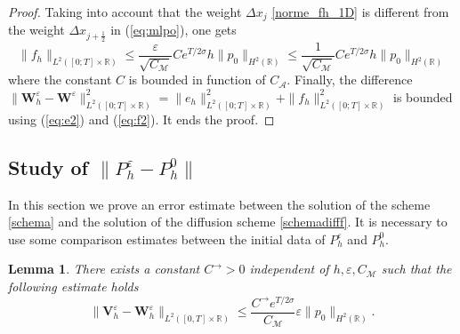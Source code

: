 \documentclass[a4paper,french,english,10pt]{article}
\newcommand\eps{\varepsilon}
\newcommand\V{\mathbf{V}}
\newcommand\W{\mathbf{W}}
\newtheorem{lemma}[theorem]{Lemma}
\begin{document}
\begin{proof}
Taking into account that the weight $\Delta x_j$  \eqref{norme_fh_1D} is different from the weight
$\Delta x_{j+\frac12}$ in (\ref{eq:mlpo}), one gets 
\begin{equation}\label{eq:f2}
\| f_h \|_{L^2([0;T]\times \mathbb{R})}\leq \frac\varepsilon {\sqrt { C_\mathcal M} } C e^{T/2\sigma }
h  \| p_0 \| _{H^2(\mathbb{R})}\leq \frac1 { \sqrt { C_\mathcal M} } C e^{T/2\sigma }
h  \| p_0 \| _{H^2(\mathbb{R})}
\end{equation}
where the constant $C$ is bounded in function of $C_\mathcal A$.
Finally, the difference 
$\|\W_h^\eps-\W^\eps\|_{L^2([0;T]\times \mathbb{R})}^2=
\|e_h\|_{L^2([0;T]\times \mathbb{R})}^2+\|f_h\|_{L^2([0;T]\times \mathbb{R})}^2
$ 
is bounded using (\ref{eq:e2}) and (\ref{eq:f2}).
It ends the proof.
\end{proof}


\subsection{Study of $\| P_h^\varepsilon - P^0_h  \|$}

In this section we 
 prove an error estimate between the solution of the
scheme \eqref{schema} and the solution of the diffusion scheme
\eqref{schemadifff}.
It is necessary  to use some comparison
estimates between the initial data of $P_h^\eps$ and $P_h^0$.

\begin{lemma} \label{gttods}
There exists a constant $C^\rightarrow >0$  independent  of $h,\eps,C_\mathcal M$ such that the following estimate holds
\begin{equation}\label{p_h_eps_p_h_0_1d}
\|\V_h^{\eps}-\W^\eps_h\|_{L^2([0,T]\times\mathbb R)} \leq %
  \frac{C^\rightarrow e^{T/2\sigma}}{ { C_\mathcal M} } \eps    \|p_0\|_{H^2(\mathbb{R})}.
\end{equation}
\end{lemma}
\end{document}
